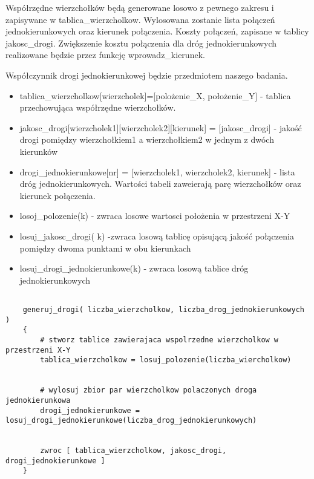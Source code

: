 \documentclass{article}
\begin{document}
Współrzędne wierzchołków będą generowane losowo z pewnego zakresu i zapisywane w tablica\_wierzcholkow. Wylosowana zostanie lista połączeń jednokierunkowych oraz kierunek połączenia. Koszty połączeń, zapisane w tablicy jakosc\_drogi. Zwiększenie kosztu połączenia dla dróg jednokierunkowych realizowane będzie przez funkcję wprowadz\_kierunek.

Współczynnik drogi jednokierunkowej będzie przedmiotem naszego badania. \\

\begin{itemize}
\item tablica\_wierzcholkow[wierzcholek]=[polożenie\_X, położenie\_Y] - tablica przechowująca współrzędne wierzchołków.
\item jakosc\_drogi[wierzcholek1][wierzcholek2][kierunek] = [jakosc\_drogi] - jakość drogi pomiędzy wierzchołkiem1 a wierzchołkiem2 w jednym z dwóch kierunków
\item drogi\_jednokierunkowe[nr] = [wierzcholek1, wierzcholek2, kierunek] - lista dróg jednokierunkowych. Wartości tabeli zaweierają parę wierzchołków oraz kierunek połączenia.
\item losoj\_polozenie(k) -  zwraca losowe wartosci położenia w przestrzeni X-Y
\item losuj\_jakosc\_drogi( k) -zwraca losową tablicę opisującą jakość połączenia pomiędzy dwoma punktami w obu kierunkach
\item losuj\_drogi\_jednokierunkowe(k) - zwraca losową tablice dróg jednokierunkowych
\end{itemize}

\begin{lstlisting}[caption={Funkcja generujaca dane wejsiowe}]

	generuj_drogi( liczba_wierzcholkow, liczba_drog_jednokierunkowych 	)
	{	
		# stworz tablice zawierajaca wspolrzedne wierzcholkow w przestrzeni X-Y
		tablica_wierzcholkow = losuj_polozenie(liczba_wiercholkow)

		
		# wylosuj zbior par wierzcholkow polaczonych droga jednokierunkowa
		drogi_jednokierunkowe = losuj_drogi_jednokierunkowe(liczba_drog_jednokierunkowych)

		
		zwroc [ tablica_wierzcholkow, jakosc_drogi, drogi_jednokierunkowe ]
	}
		

\end{lstlisting}
\end{document}
